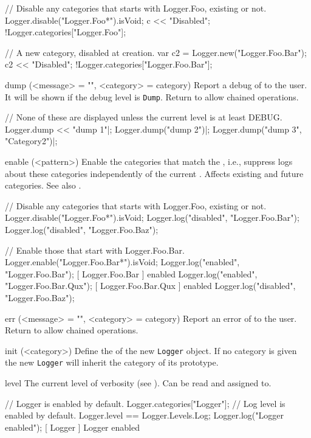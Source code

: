 \begin{urbiscriptapi}
\begin{urbiassert}
// Disable any categories that starts with Logger.Foo, existing or not.
Logger.disable("Logger.Foo*").isVoid;
c << "Disabled";
!Logger.categories["Logger.Foo"];

// A new category, disabled at creation.
var c2 = Logger.new("Logger.Foo.Bar");
c2 << "Disabled";
!Logger.categories["Logger.Foo.Bar"];
\end{urbiassert}


\item[dump](<message> = "", <category> = category)%
  Report a debug  of  to the user. It will be
  shown if the debug level is \lstinline|Dump|. Return \this to allow
  chained operations.
\begin{urbiscript}
// None of these are displayed unless the current level is at least DEBUG.
Logger.dump << "dump 1"|;
Logger.dump("dump 2")|;
Logger.dump("dump 3", "Category2")|;
\end{urbiscript}


\item[enable](<pattern>)%
  Enable the categories that match the , i.e., suppress logs
  about these categories independently of the current .
  Affects existing and future categories.  See also .
\begin{urbiassert}
// Disable any categories that starts with Logger.Foo, existing or not.
Logger.disable("Logger.Foo*").isVoid;
Logger.log("disabled", "Logger.Foo.Bar");
Logger.log("disabled", "Logger.Foo.Baz");

// Enable those that start with Logger.Foo.Bar.
Logger.enable("Logger.Foo.Bar*").isVoid;
Logger.log("enabled", "Logger.Foo.Bar");
[    Logger.Foo.Bar     ] enabled
Logger.log("enabled", "Logger.Foo.Bar.Qux");
[  Logger.Foo.Bar.Qux   ] enabled
Logger.log("disabled", "Logger.Foo.Baz");
\end{urbiassert}


\item[err](<message> = "", <category> = category)%
  Report an error  of  to the user. Return \this
  to allow chained operations.


\item[init](<category>)%
  Define the  of the new \lstinline|Logger| object. If no
  category is given the new \lstinline|Logger| will inherit the category of
  its prototype.


\item[level]%
  The current level of verbosity (see ).  Can be read and
  assigned to.
\begin{urbiassert}
// Logger is enabled by default.
Logger.categories["Logger"];
// Log level is enabled by default.
Logger.level == Logger.Levels.Log;
Logger.log("Logger enabled");
[        Logger         ] Logger enabled


\end{urbiassert}
\end{urbiscriptapi}
